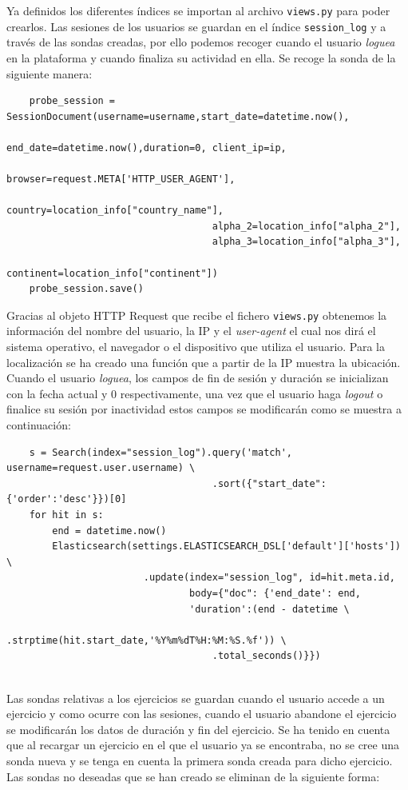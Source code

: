 Ya definidos los diferentes índices se importan al archivo \texttt{views.py} para poder crearlos. Las sesiones de los usuarios se guardan en el índice \texttt{session\_log} y a través de las sondas creadas, por ello podemos recoger cuando el usuario \textit{loguea} en la plataforma y cuando finaliza su actividad en ella. Se recoge la sonda de la siguiente manera:
\\
{\footnotesize
\begin{verbatim}
    probe_session = SessionDocument(username=username,start_date=datetime.now(),
                                    end_date=datetime.now(),duration=0, client_ip=ip,
                                    browser=request.META['HTTP_USER_AGENT'],
                                    country=location_info["country_name"],
                                    alpha_2=location_info["alpha_2"], 
                                    alpha_3=location_info["alpha_3"],
                                    continent=location_info["continent"])
    probe_session.save()
\end{verbatim}
}
\newpage
Gracias al objeto HTTP Request que recibe el fichero \texttt{views.py} obtenemos la información del nombre del usuario, la IP y el \textit{user-agent} el cual nos dirá el sistema operativo, el navegador o el dispositivo que utiliza el usuario. Para la localización se ha creado una función que a partir de la IP muestra la ubicación. Cuando el usuario \textit{loguea}, los campos  de fin de sesión y duración se inicializan con la fecha actual y 0 respectivamente, una vez que el usuario haga \textit{logout} o finalice su sesión por inactividad estos campos se modificarán como se muestra a continuación:\\
{\footnotesize
\begin{verbatim}
    s = Search(index="session_log").query('match', username=request.user.username) \
                                    .sort({"start_date": {'order':'desc'}})[0]
    for hit in s:
        end = datetime.now()
        Elasticsearch(settings.ELASTICSEARCH_DSL['default']['hosts']) \
                        .update(index="session_log", id=hit.meta.id,
                                body={"doc": {'end_date': end,
                                'duration':(end - datetime \
                                    .strptime(hit.start_date,'%Y%m%dT%H:%M:%S.%f')) \
                                    .total_seconds()}})
\end{verbatim}
}
\\
Las sondas relativas a los ejercicios se guardan cuando el usuario accede a un ejercicio y como ocurre con las sesiones, cuando el usuario abandone el ejercicio se modificarán los datos de duración y fin del ejercicio. Se ha tenido en cuenta que al recargar un ejercicio en el que el usuario ya se encontraba, no se cree una sonda nueva y se tenga en cuenta la primera sonda creada para dicho ejercicio. Las sondas no deseadas que se han creado se eliminan de la siguiente forma:\\
